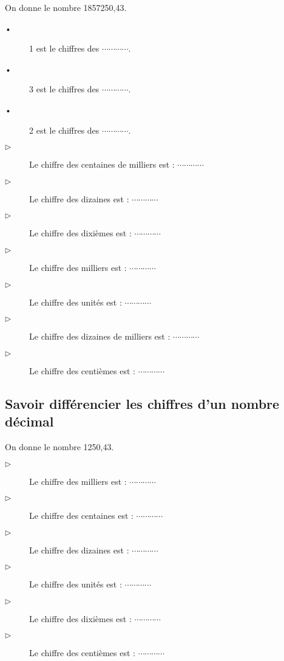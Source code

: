 
On donne le  nombre 1857250,43. 
\begin{description}
\item[•] 1 est le chiffres des $ \cdots\cdots\cdots\cdots $.
\item[•] 3 est le chiffres des $ \cdots\cdots\cdots\cdots $.
\item[•] 2 est le chiffres des $ \cdots\cdots\cdots\cdots $.

\item[$\triangleright$] Le chiffre des centaines de milliers est : $ \cdots\cdots\cdots\cdots $
\item[$\triangleright$] Le chiffre des dizaines est : $ \cdots\cdots\cdots\cdots $
\item[$\triangleright$] Le chiffre des dixièmes est : $ \cdots\cdots\cdots\cdots $
\item[$\triangleright$] Le chiffre des milliers est :  $ \cdots\cdots\cdots\cdots $
\item[$\triangleright$] Le chiffre des unités est : $ \cdots\cdots\cdots\cdots $
\item[$\triangleright$] Le chiffre des dizaines de milliers est : $ \cdots\cdots\cdots\cdots $
\item[$\triangleright$] Le chiffre des centièmes est : $ \cdots\cdots\cdots\cdots $

\end{description}


\subsection{Savoir différencier les chiffres d'un nombre décimal}


On donne le  nombre 1250,43. 
\begin{description}
\item[$\triangleright$] Le chiffre des milliers est : $ \cdots\cdots\cdots\cdots $
\item[$\triangleright$] Le chiffre des centaines est : $ \cdots\cdots\cdots\cdots $
\item[$\triangleright$] Le chiffre des dizaines est : $ \cdots\cdots\cdots\cdots $
\item[$\triangleright$] Le chiffre des unités est : $ \cdots\cdots\cdots\cdots $
\item[$\triangleright$] Le chiffre des dixièmes est : $ \cdots\cdots\cdots\cdots $
\item[$\triangleright$] Le chiffre des centièmes est : $ \cdots\cdots\cdots\cdots $
\end{description}



